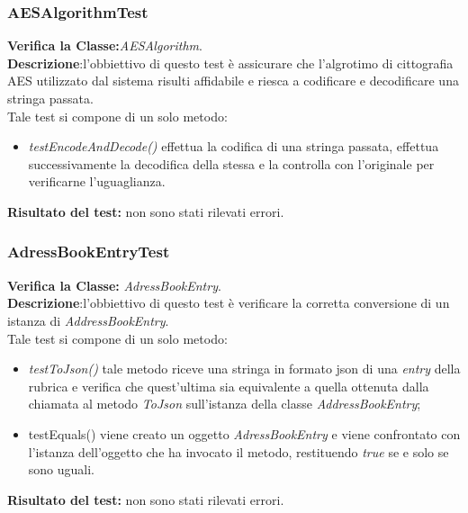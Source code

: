\subsubsection{AESAlgorithmTest}
\textbf{Verifica la Classe:}\textit{AESAlgorithm}.\\
\textbf{Descrizione}:l'obbiettivo di questo test è assicurare che l'algrotimo di cittografia AES utilizzato dal sistema \caName risulti affidabile e riesca a codificare e decodificare una stringa passata.\\
Tale test si compone di un solo metodo:
\begin{itemize}
\item \textit{testEncodeAndDecode() } effettua la codifica di una stringa passata, effettua successivamente la decodifica della stessa e la controlla con l'originale per verificarne l'uguaglianza.
\end{itemize}
\textbf{Risultato del test:} non sono stati rilevati errori.

\begin{table}
\end{table}

\subsubsection{AdressBookEntryTest}
\textbf{Verifica la Classe:} \textit{AdressBookEntry}.\\
\textbf{Descrizione}:l'obbiettivo di questo test è verificare la corretta conversione di un istanza di \textit{AddressBookEntry}.\\
Tale test si compone di un solo metodo:
\begin{itemize}
\item \textit{testToJson() } tale metodo riceve una stringa in formato json di una 	\textit{entry} della rubrica e verifica che quest'ultima sia equivalente a quella ottenuta dalla chiamata al metodo \textit{ToJson} sull'istanza della classe \textit{AddressBookEntry};
\item{testEquals()} viene creato un oggetto \textit{AdressBookEntry} e viene confrontato con l'istanza dell'oggetto che ha invocato il metodo, restituendo \textit{true} se e solo se sono uguali.
\end{itemize}
\textbf{Risultato del test:} non sono stati rilevati errori.

